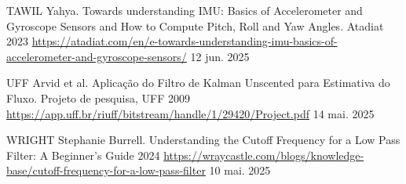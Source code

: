     {TAWIL}
    {Yahya. Towards understanding IMU: Basics of Accelerometer and Gyroscope Sensors and How to Compute Pitch, Roll and Yaw Angles. Atadiat}
    {2023}
    {\url{https://atadiat.com/en/e-towards-understanding-imu-basics-of-accelerometer-and-gyroscope-sensors/}}
    {12 jun. 2025}

    {UFF}
    {Arvid et al. Aplicação do Filtro de Kalman Unscented para Estimativa do Fluxo. Projeto de pesquisa, UFF}
    {2009}
    {\url{https://app.uff.br/riuff/bitstream/handle/1/29420/Project.pdf}}
    {14 mai. 2025}

    {WRIGHT}
    {Stephanie Burrell. Understanding the Cutoff Frequency for a Low Pass Filter: A Beginner's Guide}
    {2024}
    {\url{https://wraycastle.com/blogs/knowledge-base/cutoff-frequency-for-a-low-pass-filter}}
    {10 mai. 2025}


\phantom{a}